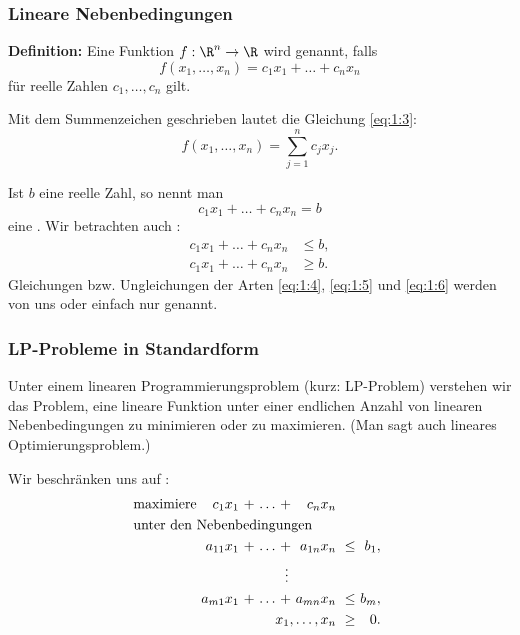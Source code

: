 \documentclass[smaller]{beamer}
\begin{document}
\begin{frame}
\frametitle{Lineare Nebenbedingungen}
\textbf{Definition:} Eine Funktion $f: \R^n \rightarrow \R$ wird  genannt, falls
\begin{equation}
\label{eq:1:3}
f ( x_1,\ldots,x_n ) = c_1x_1 + \ldots + c_nx_n
\end{equation}
für reelle Zahlen $c_1, \ldots, c_n$ gilt. 

Mit dem Summenzeichen geschrieben lautet die Gleichung \eqref{eq:1:3}:
\begin{equation*}
f(x_1,\ldots,x_n) = \sum_{j=1}^{n}{c_jx_j}.
\end{equation*}

Ist $b$ eine reelle Zahl, so nennt man 
\begin{equation}
\label{eq:1:4}
c_1x_1 + \ldots + c_nx_n = b
\end{equation}
eine . Wir betrachten auch :
\begin{align}
\label{eq:1:5}
c_1x_1 + \ldots + c_nx_n &\leq b, \\
\label{eq:1:6}
c_1x_1 + \ldots + c_nx_n &\geq b.
\end{align}
Gleichungen bzw. Ungleichungen der Arten \eqref{eq:1:4}, \eqref{eq:1:5} und \eqref{eq:1:6} werden von uns  oder einfach nur  genannt.
\end{frame}

\begin{frame}
\frametitle{LP-Probleme in Standardform}
 Unter einem linearen Programmierungsproblem (kurz: LP-Problem) verstehen wir das Problem, eine lineare Funktion unter einer endlichen Anzahl von linearen Nebenbedingungen zu minimieren oder zu maximieren. (Man sagt auch {\glqq}lineares Optimierungsproblem{\grqq}.)
 
Wir beschränken uns auf :
\begin{align} \label{eq:1.7}
\begin{alignedat}{5}
& \text{maximiere } & c_1x_1 &\ + &\ \ldots &\ + &\ c_nx_n & & \\
& \rlap{unter den Nebenbedingungen} & & & & & & & \\
&& a_{11}x_1 &\ + &\ \ldots &\ + &\ a_{1n}x_n &\ \leq &\ b_1,\ \\
&& & & & \ \ \vdots & & &  \\
&& a_{m1}x_1 &\ + &\ \ldots &\ + &\ a_{mn}x_n &\ \leq &\ b_m,\ \\
&& & & & & \llap{$x_1, \ldots, x_n$} &\ \geq &\ 0.\ 
\end{alignedat}
\end{align}
\end{frame}
\end{document}
